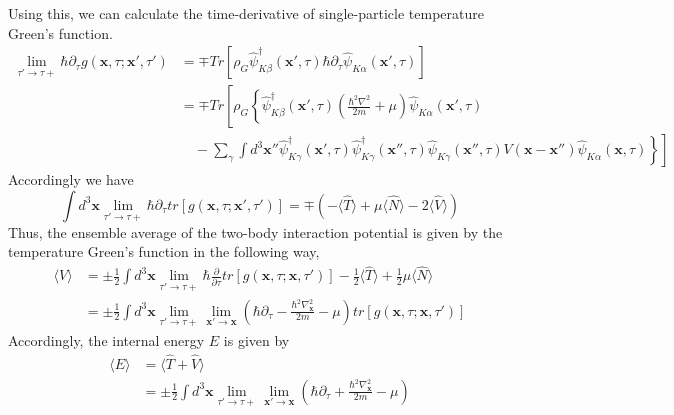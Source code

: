Using this, we can calculate the time-derivative of single-particle temperature Green's function.
$$
\begin{aligned}
\lim_{\tau'\rightarrow\tau+}\hbar\partial_{\tau} g(\mathbf{x},\tau;\mathbf{x'},\tau')&=\mp Tr\left[\rho_{G} \hat{\psi}_{K\beta}^{\dagger}(\mathbf{x'},\tau) \hbar\partial_{\tau} \hat{\psi}_{K\alpha}(\mathbf{x'},\tau)\right]\\
&=\mp Tr\left[\rho_{G} \left\{ \hat{\psi}_{K\beta}^{\dagger}(\mathbf{x'},\tau) \left(\frac{\hbar^{2}\nabla^{2}}{2m}+\mu\right) \hat{\psi}_{K\alpha}(\mathbf{x'},\tau)\right.\right.\\
& \left.\left. \quad -\sum_{\gamma}\int d^{3}\mathbf{x''}\hat{\psi}_{K\gamma}^{\dagger}(\mathbf{x'},\tau)\hat{\psi}_{K\gamma}^{\dagger}(\mathbf{x''},\tau) \hat{\psi}_{K\gamma}(\mathbf{x''},\tau) V(\mathbf{x}-\mathbf{x''}) \hat{\psi}_{K\alpha}(\mathbf{x},\tau) \right\} \right]
\end{aligned}
$$
Accordingly we have
$$
\int d^{3}\mathbf{x}\lim_{\tau'\rightarrow\tau+}\hbar \partial_{\tau} tr[g(\mathbf{x},\tau;\mathbf{x'},\tau')]=\mp \left(-\langle\hat{T}\rangle +\mu \langle\hat{N}\rangle -2\langle\hat{V}\rangle\right)
$$
Thus, the ensemble average of the two-body interaction potential is given by the temperature Green's function in the following way,
\begin{equation} \label{eq1}
\begin{aligned}
\langle V\rangle&=\pm\frac{1}{2} \int d^{3} \mathbf{x} \lim_{\tau'\rightarrow\tau+} \hbar \frac{\partial}{\partial\tau} tr[g(\mathbf{x},\tau;\mathbf{x},\tau')] -\frac{1}{2}\langle\hat{T}\rangle + \frac{1}{2}\mu\langle\hat{N}\rangle\\
&=\pm\frac{1}{2} \int d^{3} \mathbf{x} \lim_{\tau'\rightarrow\tau+} \lim_{\mathbf{x}'\rightarrow\mathbf{x}}\left(\hbar\partial_{\tau}-\frac{\hbar^{2}\nabla_{\mathbf{x}}^{2}}{2m}-\mu\right) tr[g(\mathbf{x},\tau;\mathbf{x},\tau')]
\end{aligned}
\end{equation}
Accordingly, the internal energy $E$ is given by
\begin{equation}\label{eq4.1.14}
\begin{aligned}
\langle E\rangle & =\langle \hat{T}+\hat{V} \rangle\\
&=\pm\frac{1}{2} \int d^{3} \mathbf{x} \lim_{\tau'\rightarrow\tau+} \lim_{\mathbf{x}'\rightarrow\mathbf{x}}\left(\hbar\partial_{\tau}+\frac{\hbar^{2}\nabla_{\mathbf{x}}^{2}}{2m}-\mu\right)
\end{aligned}
\end{equation}
